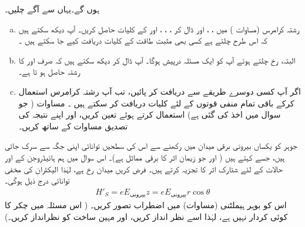 ہوں گے۔یہاں سے آگے چلیں۔
 
\begin{enumerate}[a.]
\item
 رشتہ  کرامرس   (مساوات  )   میں ، ،   اور   ڈال کر   
، ، ،  اور 
 کے کلیات حاصل کریں۔ آپ دیکھ سکتے ہیں کہ  اس طرح چلتے ہے کسی بھی مثبت طاقت کے  کلیات  دریافت کیے جا سکتے  ہیں ۔
\item
البتہ،    رخ چلتے ہوئے  آپ کو ایک  مسئلہ  درپیش  ہوگا۔  آپ   ڈال  کر دیکھ سکتے ہیں  کہ صرف   اور 
   کا  رشتہ حاصل ہو  تا ہے۔
\item
 اگر آپ کسی دوسرے طریقے سے    دریافت کر پائیں،  تب آپ رشتہ کرامرس  استعمال کرکے باقی تمام منفی قوتوں کے لئے کلیات دریافت کر سکتے ہیں ۔
مساوات   (  جو سوال  میں اخذ کی گئی ہے)    استعمال کرتے ہوئے  
تعین کریں،  اور اپنے نتیجہ کی تصدیق مساوات  کے ساتھ کریں۔
\end{enumerate}
 جوہر کو    یکساں   بیرونی برقی میدان  میں رکھنے سے اس کی  سطحیں   توانائی  اپنی جگہ سے سرک جاتی  ہیں،  جسے   کہتے ہیں ( اور جو  زیمان  اثر کا برقی مماثل ہے)۔ اس سوال میں ہم ہائیڈروجن کے   اور   حالات کے لئے شٹارک اثر کا تجزیہ کرتے ہیں۔ فرض کریں میدان  رخ ہے،  لہٰذا الیکٹران کی مخفی توانائی درج ذیل ہوگی۔
\begin{align*}
H'_{S}=eE_{\text{بیرونی}}z=eE_{\text{بیرونی}}r\cos{\theta}
\end{align*}
اس کو بوہر ہیملٹنی  (مساوات) میں اضطراب تصور کریں۔ ( اس مسئلہ میں چکر کا کوئی کردار نہیں ہے،  لہٰذا اسے نظر انداز کریں،  اور   مہین  ساخت کو  نظرانداز  کریں۔)
